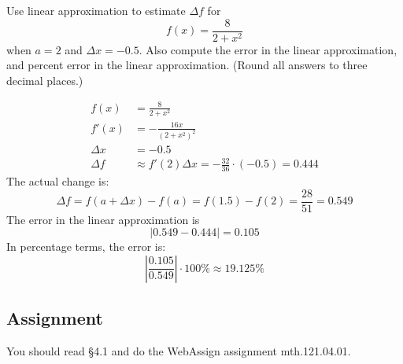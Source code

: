 \documentclass[12pt,addpoints, answers, fleqn]{exam}
\begin{document}
\begin{questions}
\question Use linear approximation to estimate $\Delta f$ for
\[ 
f\left(x\right) = \frac{8}{2+x^2} 
\]
 when $a = 2$ and $\Delta x = -0.5$. Also compute the error in the linear approximation, and percent error in the linear approximation. (Round all answers to three decimal places.)
\begin{solution}
\begin{align*}
f\left(x\right) &= \frac{8}{2+x^2} \\
f'\left(x\right) &= - \frac{16x}{\left(2+x^2\right)^2} \\
\Delta x &= -0.5\\
\Delta f & \approx f' \left(2\right) \Delta x = -\frac{32}{36}\cdot \left(-0.5\right) = 0.444
\end{align*}
The actual change is:
\[
\Delta f = f \left( a + \Delta x\right) - f \left( a \right) = f \left( 1.5\right) - f \left( 2 \right) = \frac{28}{51} = 0.549
\]
The error in the linear approximation is
\[
\left| 0.549 - 0.444 \right| = 0.105
\]
In percentage terms, the error is:
\[
\left| \frac{0.105}{0.549} \right| \cdot 100 \% \approx 19.125 \%
\]
\end{solution}























\end{questions}
\subsection{Assignment}
You should read \S  4.1 and do the WebAssign assignment mth.121.04.01.
\vfill
\pagebreak
\end{document}
